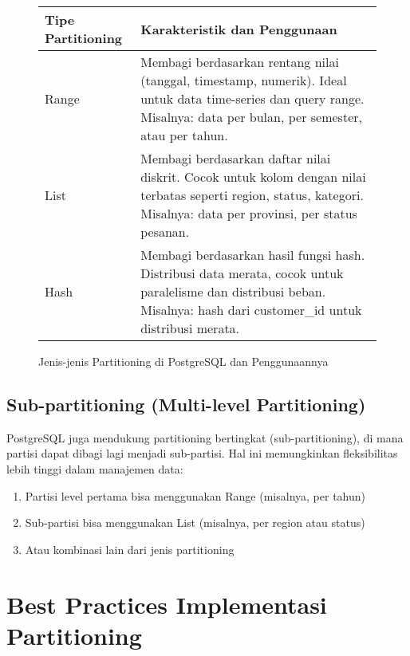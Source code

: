\begin{figure}[h]
	\centering
	\begin{tabular}{|l|p{10cm}|}
		\hline
		\textbf{Tipe Partitioning} & \textbf{Karakteristik dan Penggunaan} \\
		\hline
		Range & Membagi berdasarkan rentang nilai (tanggal, timestamp, numerik). Ideal untuk data time-series dan query range. Misalnya: data per bulan, per semester, atau per tahun. \\
		\hline
		List & Membagi berdasarkan daftar nilai diskrit. Cocok untuk kolom dengan nilai terbatas seperti region, status, kategori. Misalnya: data per provinsi, per status pesanan. \\
		\hline
		Hash & Membagi berdasarkan hasil fungsi hash. Distribusi data merata, cocok untuk paralelisme dan distribusi beban. Misalnya: hash dari customer\_id untuk distribusi merata. \\
		\hline
	\end{tabular}
	\caption{Jenis-jenis Partitioning di PostgreSQL dan Penggunaannya}
\end{figure}

\subsection{Sub-partitioning (Multi-level Partitioning)}
PostgreSQL juga mendukung partitioning bertingkat (sub-partitioning), di mana partisi dapat dibagi lagi menjadi sub-partisi. Hal ini memungkinkan fleksibilitas lebih tinggi dalam manajemen data:

\begin{enumerate}
    \item Partisi level pertama bisa menggunakan Range (misalnya, per tahun)
    \item Sub-partisi bisa menggunakan List (misalnya, per region atau status)
    \item Atau kombinasi lain dari jenis partitioning
\end{enumerate}

\section{Best Practices Implementasi Partitioning}

